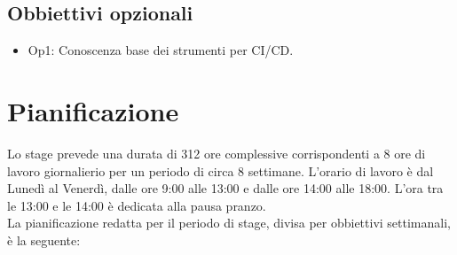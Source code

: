 \subsection{Obbiettivi opzionali}
\begin{itemize}
    \item Op1: Conoscenza base dei strumenti per CI/CD.
\end{itemize}

\section{Pianificazione}
Lo stage prevede una durata di 312 ore complessive corrispondenti a 8 ore di lavoro giornalierio per un periodo di circa 8 settimane. L'orario di lavoro è dal Lunedì al Venerdì, dalle ore 9:00 alle 13:00 e dalle ore 14:00 alle 18:00. L'ora tra le 13:00 e le 14:00 è dedicata alla pausa pranzo.
\\La pianificazione redatta per il periodo di stage, divisa per obbiettivi settimanali, è la seguente:

